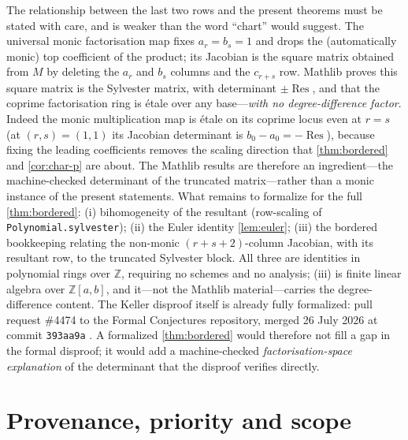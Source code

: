 \documentclass[11pt,reqno]{amsart}
\theoremstyle{definition}
\theoremstyle{remark}
\newcommand{\Z}{\mathbb Z}
\newcommand{\Res}{\operatorname{Res}}
\begin{document}
The relationship between the last two rows and the present theorems
must be stated with care, and is weaker than the word ``chart'' would
suggest.  The universal monic factorisation map fixes
$a_r=b_s=1$ and drops the (automatically monic) top coefficient of
the product; its Jacobian is the square matrix obtained from
$M$ by deleting the $a_r$ and $b_s$ columns and the $c_{r+s}$ row.
Mathlib proves this square matrix is the Sylvester matrix, with
determinant $\pm\Res$, and that the coprime factorisation ring is
\'etale over any base---\emph{with no degree-difference factor}.
Indeed the monic multiplication map is \'etale on its coprime locus
even at $r=s$ (at $(r,s)=(1,1)$ its Jacobian determinant is
$b_0-a_0=-\Res$), because fixing the leading coefficients removes the
scaling direction that \cref{thm:bordered} and
\cref{cor:char-p} are about.  The Mathlib results are therefore an
ingredient---the machine-checked determinant of the truncated
matrix---rather than a monic instance of the present statements.
What remains to formalize for the full \cref{thm:bordered}:
(i) bihomogeneity of the resultant (row-scaling of
\texttt{Polynomial.sylvester}); (ii) the Euler identity
\cref{lem:euler}; (iii) the bordered bookkeeping relating the
non-monic $(r+s+2)$-column Jacobian, with its resultant row, to the
truncated Sylvester block.  All three are identities in polynomial
rings over $\Z$, requiring no schemes and no analysis; (iii) is
finite linear algebra over $\Z[a,b]$, and it---not the Mathlib
material---carries the degree-difference content.  The Keller
disproof itself is already fully formalized: pull request \#4474 to
the Formal Conjectures repository, merged 26 July 2026 at commit
\texttt{393aa9a} \cite{LezeauPR}.  A formalized
\cref{thm:bordered} would therefore not fill a gap in the formal
disproof; it would add a machine-checked \emph{factorisation-space
explanation} of the determinant that the disproof verifies
directly.

\section{Provenance, priority and scope}\label{sec:provenance}
\end{document}
